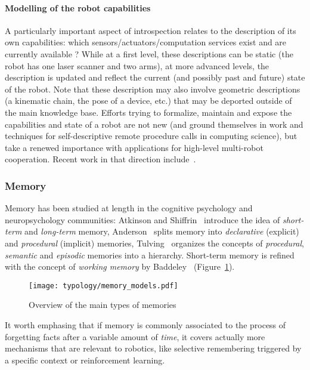\paragraph{Modelling of the robot capabilities}

A particularly important aspect of introspection relates to the description of
its own capabilities: which sensors/actuators/computation services exist and
are currently available ?  While at a first level, these descriptions can be
static (\eg the robot has one laser scanner and two arms), at more advanced
levels, the description is updated and reflect the current (and possibly past
and future) state of the robot. Note that these description may also involve
geometric descriptions (a kinematic chain, the pose of a device, etc.) that may
be deported outside of the main knowledge base. Efforts trying to formalize,
maintain and expose the capabilities and state of a robot are not new (and
ground themselves in work and techniques for self-descriptive remote procedure
calls in computing science), but take a renewed importance with applications
for high-level multi-robot cooperation. Recent work in that direction
include~\cite{Kunze2011}.

\subsubsection{Memory}
\label{sect|memory}

Memory has been studied at length in the cognitive psychology and
neuropsychology communities: Atkinson and Shiffrin~\cite{Atkinson1968}
introduce the idea of \emph{short-term} and \emph{long-term} memory,
Anderson~\cite{Anderson1976} splits memory into \emph{declarative} (explicit)
and \emph{procedural} (implicit) memories, Tulving~\cite{Tulving1985} organizes
the concepts of \emph{procedural}, \emph{semantic} and \emph{episodic} memories
into a hierarchy. Short-term memory is refined with the concept of
\emph{working memory} by Baddeley~\cite{Baddeley2010}
(Figure~\ref{fig|memory_models}).

\begin{figure}
    \centering
    \texttt{[image: typology/memory\_models.pdf]}
    \caption{Overview of the main types of memories}
    \label{fig|memory_models}
\end{figure}

It worth emphasing that if memory is commonly associated to the process of
forgetting facts after a variable amount of \emph{time}, it covers actually
more mechanisms that are relevant to robotics, like selective remembering
triggered by a specific context or reinforcement learning.

